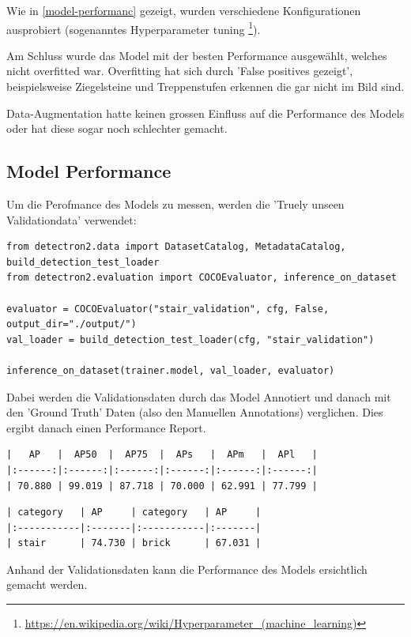 Wie in \ref{model-performanc} gezeigt, wurden verschiedene Konfigurationen ausprobiert 
(sogenanntes Hyperparameter tuning \footnote{\url{https://en.wikipedia.org/wiki/Hyperparameter_(machine_learning)}}).

Am Schluss wurde das Model mit der besten Performance ausgewählt, welches nicht overfitted war.
Overfitting hat sich durch 'False positives gezeigt', beispielsweise Ziegelsteine und Treppenstufen erkennen die gar nicht im
Bild sind.

Data-Augmentation \cite{perez2017effectiveness} hatte keinen grossen Einfluss auf die Performance des Models
oder hat diese sogar noch schlechter gemacht.

\subsection{Model Performance}

Um die Perofmance des Models zu messen, werden die 'Truely unseen Validationdata' verwendet:

\begin{verbatim}
from detectron2.data import DatasetCatalog, MetadataCatalog, build_detection_test_loader
from detectron2.evaluation import COCOEvaluator, inference_on_dataset

evaluator = COCOEvaluator("stair_validation", cfg, False, output_dir="./output/")
val_loader = build_detection_test_loader(cfg, "stair_validation")

inference_on_dataset(trainer.model, val_loader, evaluator)
\end{verbatim}

Dabei werden die Validationsdaten durch das Model Annotiert und danach mit den 'Ground Truth' Daten 
(also den Manuellen Annotations) verglichen. Dies ergibt danach einen Performance Report.

\begin{verbatim}
|   AP   |  AP50  |  AP75  |  APs   |  APm   |  APl   |
|:------:|:------:|:------:|:------:|:------:|:------:|
| 70.880 | 99.019 | 87.718 | 70.000 | 62.991 | 77.799 |
\end{verbatim}

\begin{verbatim}
| category   | AP     | category   | AP     |
|:-----------|:-------|:-----------|:-------|
| stair      | 74.730 | brick      | 67.031 |
\end{verbatim}

Anhand der Validationsdaten kann die Performance des Models ersichtlich gemacht werden.

